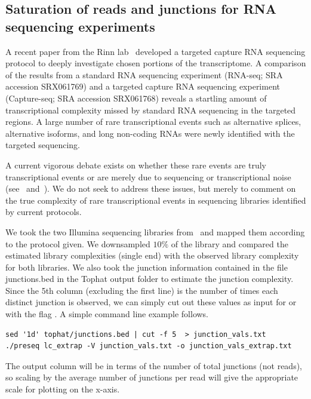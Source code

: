 \documentclass[11pt, titlepage]{article}
\begin{document}
\newpage


\subsection*{Saturation of reads and junctions for RNA sequencing experiments}

A recent paper from the Rinn lab~\cite{mercer2011targeted}
developed a targeted capture RNA sequencing
protocol to deeply investigate chosen portions of the transcriptome.  
A comparison of the results from a standard RNA sequencing
experiment (RNA-seq; SRA accession SRX061769) and a targeted capture RNA sequencing
experiment (Capture-seq; SRA accession SRX061768) reveals
a startling amount of transcriptional complexity missed by standard
RNA sequencing in the targeted regions.  A large number of
rare transcriptional events such as alternative splices, alternative isoforms,
and long non-coding RNAs were newly identified with the targeted sequencing.

A current vigorous debate exists on whether these rare events are truly transcriptional
events or are merely due to sequencing or transcriptional noise 
(see~\cite{van2010most} and~\cite{clark2011reality}).  We do not seek to address
these issues, but merely to comment on the true complexity
of rare transcriptional events in sequencing libraries identified by current
protocols.

We took the two Illumina sequencing libraries from~\cite{mercer2011targeted} and
mapped them according to the protocol given.  We downsampled $10 \%$ of the library
and compared the estimated library complexities (single end) with the observed library
complexity for both libraries.  We also took the junction information contained in the file
junctions.bed in the Tophat output folder to estimate the junction complexity.  Since
the 5th column (excluding the first line) is the number of times each
distinct junction is observed, we can simply cut out these values as input for
 or  with the flag .  A simple command line example follows.

\begin{verbatim}
sed '1d' tophat/junctions.bed | cut -f 5  > junction_vals.txt
./preseq lc_extrap -V junction_vals.txt -o junction_vals_extrap.txt 
\end{verbatim}

The output  column will be in terms of the number of 
total junctions (not reads), so scaling by the average number of junctions per 
read will give the appropriate scale for plotting on the x-axis.  
\end{document}
